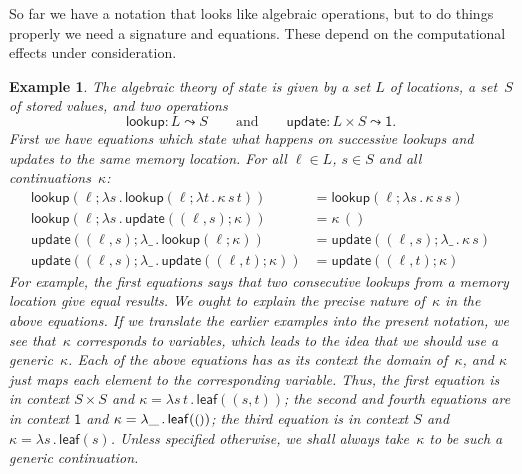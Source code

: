 \documentclass{amsart}
\newcommand{\lam}[1]{\lambda #1 \,.\,}
\newcommand{\leaf}[1]{\mathsf{leaf}(#1)} %
\newcommand{\opdecl}[3]{#1 : #2 \leadsto #3} %
\newcommand{\one}{\mathsf{1}} %
\newcommand{\unit}{{\text{\small$()$}}} %
\newcommand{\kode}[1]{\mathsf{#1}}
\newcommand{\opcall}[3]{\kode{#1}(#2; #3)}
\newtheorem{example}[definition]{Example}
\begin{document}
So far we have a notation that looks like algebraic operations, but to do things
properly we need a signature and equations. These depend on the computational
effects under consideration.

\begin{example}
  \label{ex:theory-state}
  The algebraic theory of \emph{state} is given by a set $L$ of
  \emph{locations}, a set~$S$ of stored values, and two operations
  \begin{equation*}
    \opdecl{\kode{lookup}}{L}{S}
    \qquad\text{and}\qquad
    \opdecl{\kode{update}}{L \times S}{\one}.
  \end{equation*}
  First we have equations which state what happens on successive lookups and
  updates to the same memory location. For all $\ell \in L$, $s \in S$ and
  all continuations~$\kappa$:
  \begin{align*}
    \opcall{lookup}{\ell}{
      \lam{s}{
        \opcall{lookup}{\ell}{
        \lam{t} \kappa \, s \, t}
      }
    } &=
    \opcall{lookup}{\ell}{\lam{s}{\kappa \, s \, s}}
    \\
    \opcall{lookup}{\ell}{
      \lam{s} \opcall{update}{(\ell, s)}{\kappa}
    } &=
    \kappa \, ()
    \\
    \opcall{update}{(\ell, s)}{
      \lam{\_} \opcall{lookup}{\ell}{\kappa}
    } &=
    \opcall{update}{(\ell, s)}{\lam{\_} \kappa \, s}
    \\
    \opcall{update}{(\ell, s)}{
      \lam{\_} \opcall{update}{(\ell, t)}{\kappa}
    } &=
    \opcall{update}{(\ell, t)}{\kappa}
  \end{align*}
  For example, the first equations says that two consecutive lookups from a
  memory location give equal results. We ought to explain the precise nature
  of~$\kappa$ in the above equations. If we translate the earlier examples into
  the present notation, we see that~$\kappa$ corresponds to variables, which
  leads to the idea that we should use a \emph{generic}~$\kappa$. Each of the
  above equations has as its context the domain of~$\kappa$, and $\kappa$ just
  maps each element to the corresponding variable. Thus, the first equation is
  in context $S \times S$ and $\kappa = \lam{s \, t } \leaf {(s, t)}$; the
  second and fourth equations are in context $\one$ and
  $\kappa = \lam{\_} \leaf{\unit}$; the third equation is in context $S$ and
  $\kappa = \lam{s} \leaf{s}$. Unless specified otherwise, we shall always
  take~$\kappa$ to be such a generic continuation.


\end{example}
\end{document}
